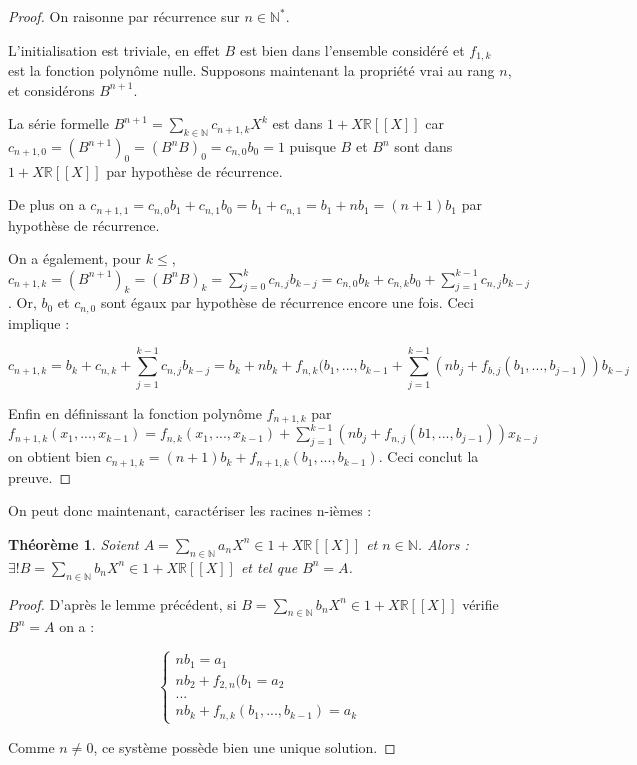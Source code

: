 \documentclass[12pt,a4paper]{amsart}
\newtheorem{thm}{\bf Th\'eor\`eme}
\begin{document}
\begin{proof}

On raisonne par récurrence sur $n \in \mathbb{N}^{\ast}. $

L'initialisation est triviale, en effet $B$ est bien dans l'ensemble considéré et $f_{1,k}$ est la fonction polynôme nulle. Supposons maintenant la propriété vrai au rang $n$, et considérons $B^{n+1}$. 

La série formelle $B^{n+1}= \sum_{k\in \mathbb{N}} c_{n+1,k}X^{k}$ est dans $1+X\mathbb{R}[[X]]$ car $c_{n+1,0}=(B^{n+1})_{0}=(B^{n}B)_{0}=c_{n,0}b_{0}=1$ puisque $B$ et $B^{n}$ sont dans $ 1+X\mathbb{R}[[X]]$ par hypothèse de récurrence. 

De plus on a $c_{n+1,1}=c_{n,0}b_{1}+c_{n,1}b_{0}=b_{1}+c_{n,1}=b_{1}+nb_{1}=(n+1)b_{1}$ par hypothèse de récurrence. 

On a également, pour $k\leq $, $c_{n+1,k}=(B^{n+1})_{k}=(B^{n}B)_{k}=\sum_{j=0}^{k} c_{n,j}b_{k-j}=c_{n,0}b_{k}+c_{n,k}b_{0}+\sum_{j=1}^{k-1}c_{n,j}b_{k-j}$. Or, $b_{0}$ et $c_{n,0}$ sont égaux par hypothèse de récurrence encore une fois. Ceci implique :

$$c_{n+1,k}=b_{k}+c_{n,k}+\sum_{j=1}^{k-1} c_{n,j}b_{k-j}=b_{k} +nb_{k} + f_{n,k}(b_{1},...,b_{k-1}+ \sum_{j=1}^{k-1}(nb_{j}+f_{b,j}(b_{1},...,b_{j-1}))b_{k-j}$$

Enfin en définissant la fonction polynôme $f_{n+1,k}$ par $f_{n+1,k}(x_{1},...,x_{k-1})=f_{n,k}(x_{1},...,x_{k-1})+\sum_{j=1}^{k-1}(nb_{j} +f_{n,j}(b1,...,b_{j-1}))x_{k-j}$ on obtient bien $c_{n+1,k}=(n+1)b_{k}+f_{n+1,k}(b_{1},...,b_{k-1})$. Ceci conclut la preuve. 
\end{proof}

On peut donc maintenant, caractériser les racines n-ièmes  : 

\begin{thm}\rm

Soient $A=\sum_{n\in\mathbb{N}} a_{n}X^{n} \in  1+X\mathbb{R}[[X]]$ et $n\in \mathbb{N}$. Alors : $\exists ! B=\sum_{n\in\mathbb{N}} b_{n}X^{n} \in  1+X\mathbb{R}[[X]]$ et tel que $B^{n}=A$. 

\end{thm}

\begin{proof}
D'après le lemme précédent, si $B=\sum_{n\in\mathbb{N}} b_{n}X^{n}\in  1+X\mathbb{R}[[X]]$ vérifie $B^{n}=A$ on a : 

$$ \left\{
	\begin{array}{ll}
	nb_{1}=a_{1} \\
	nb_{2}+f_{2,n}(b_{1}=a_{2}\\
	...\\
	nb_{k}+f_{n,k}(b_{1},...,b_{k-1})=a_{k}
	\end{array}
\right.
$$

Comme $n\neq0$, ce système possède bien une unique solution. 
\end{proof}
\end{document}
